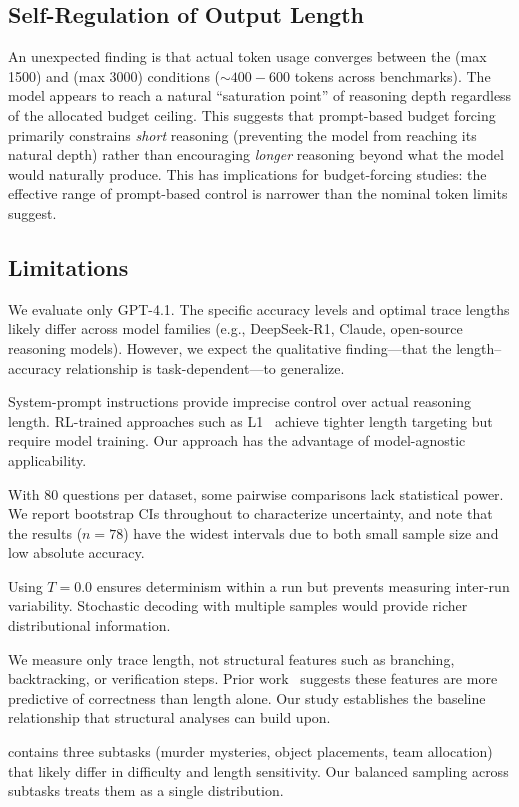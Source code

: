 \subsection{Self-Regulation of Output Length}
\label{sec:discussion:selfregulation}

An unexpected finding is that actual token usage converges between the \longbudget (max 1500) and \unconst (max 3000) conditions (${\sim}400{-}600$ tokens across benchmarks). The model appears to reach a natural ``saturation point'' of reasoning depth regardless of the allocated budget ceiling. This suggests that prompt-based budget forcing primarily constrains \emph{short} reasoning (preventing the model from reaching its natural depth) rather than encouraging \emph{longer} reasoning beyond what the model would naturally produce. This has implications for budget-forcing studies: the effective range of prompt-based control is narrower than the nominal token limits suggest.

\subsection{Limitations}
\label{sec:discussion:limitations}

 We evaluate only GPT-4.1. The specific accuracy levels and optimal trace lengths likely differ across model families (e.g., DeepSeek-R1, Claude, open-source reasoning models). However, we expect the qualitative finding---that the length--accuracy relationship is task-dependent---to generalize.

 System-prompt instructions provide imprecise control over actual reasoning length. RL-trained approaches such as L1~\citep{aggarwal2025l1} achieve tighter length targeting but require model training. Our approach has the advantage of model-agnostic applicability.

 With 80 questions per dataset, some pairwise comparisons lack statistical power. We report bootstrap CIs throughout to characterize uncertainty, and note that the \musr results ($n{=}78$) have the widest intervals due to both small sample size and low absolute accuracy.

 Using $T{=}0.0$ ensures determinism within a run but prevents measuring inter-run variability. Stochastic decoding with multiple samples would provide richer distributional information.

 We measure only trace length, not structural features such as branching, backtracking, or verification steps. Prior work~\citep{jiang2025goodchain} suggests these features are more predictive of correctness than length alone. Our study establishes the baseline relationship that structural analyses can build upon.

 \musr contains three subtasks (murder mysteries, object placements, team allocation) that likely differ in difficulty and length sensitivity. Our balanced sampling across subtasks treats them as a single distribution.
